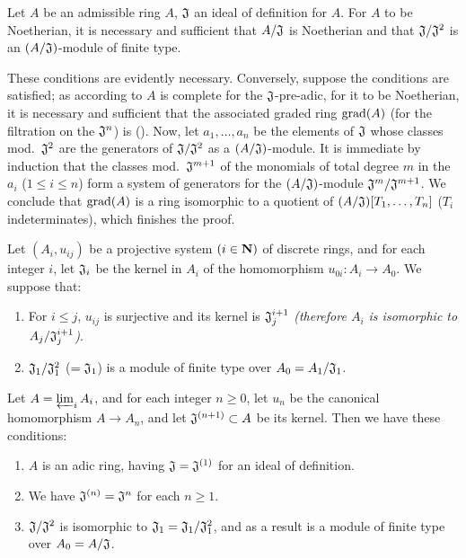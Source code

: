 \begin{cor}[7.2.6]
\label{0.7.2.6}
Let $A$ be an admissible ring $A$, $\mathfrak{J}$ an ideal of definition for
$A$. For $A$ to be Noetherian, it is necessary and sufficient that
$A/\mathfrak{J}$ is Noetherian and that $\mathfrak{J}/\mathfrak{J}^2$ is an
$(A/\mathfrak{J})$-module of finite type.
\end{cor}

These conditions are evidently necessary. Conversely, suppose the conditions
are satisfied; as according to  $A$ is complete for the
$\mathfrak{J}$-pre-adic, for it to be Noetherian, it is necessary and sufficient
that the associated graded ring ${\mathop{\mathrm{grad}}\nolimits}(A)$ (for the filtration on the
$\mathfrak{J}^n$) is (\cite[p~.18--07, th.~4]{I-1}). Now, let $a_1,\dots,a_n$ be
the elements of $\mathfrak{J}$ whose classes mod.~$\mathfrak{J}^2$ are the
generators of $\mathfrak{J}/\mathfrak{J}^2$ as a $(A/\mathfrak{J})$-module. It
is immediate by induction that the classes mod.~$\mathfrak{J}^{m+1}$ of the
monomials of total degree $m$ in the $a_i$ ($1\leqslant i\leqslant n$) form a
system of generators for the $(A/\mathfrak{J})$-module
$\mathfrak{J}^m/\mathfrak{J}^{m+1}$. We conclude that ${\mathop{\mathrm{grad}}\nolimits}(A)$ is a ring
isomorphic to a quotient of $(A/\mathfrak{J})[T_1,\dots,T_n]$ ($T_i$
indeterminates), which finishes the proof.

\begin{prop}[7.2.7]
\label{0.7.2.7}
Let $(A_i,u_{ij})$ be a projective system $(i\in\mathbf{N})$ of discrete rings, and
for each integer $i$, let $\mathfrak{J}_i$ be the kernel in $A_i$ of the
homomorphism $u_{0i}:A_i\to A_0$. We suppose that:
\begin{enumerate}[label=\emph{(\alph*)}]
  \item For $i\leqslant j$, $u_{ij}$ is surjective and its kernel is $\mathfrak{J}_j^{i+1}$
    \emph{(therefore $A_i$ is isomorphic to $A_j/\mathfrak{J}_j^{i+1}$)}.
  \item $\mathfrak{J}_1/\mathfrak{J}_1^2$ ($=\mathfrak{J}_1$) is a module of
    finite type over $A_0=A_1/\mathfrak{J}_1$.
\end{enumerate}
Let $A=\varprojlim_i A_i$, and for each integer $n\geqslant 0$, let $u_n$ be the
canonical homomorphism $A\to A_n$, and let $\mathfrak{J}^{(n+1)}\subset A$ be
its kernel. Then we have these conditions:
\begin{enumerate}[label=\emph{(\roman*)}]
  \item $A$ is an adic ring, having $\mathfrak{J}=\mathfrak{J}^{(1)}$ for an
    ideal of definition.
  \item We have $\mathfrak{J}^{(n)}=\mathfrak{J}^n$ for each $n\geqslant 1$.
  \item $\mathfrak{J}/\mathfrak{J}^2$ is isomorphic to
    $\mathfrak{J}_1=\mathfrak{J}_1/\mathfrak{J}_1^2$, and as a result is a module of finite type
    over $A_0=A/\mathfrak{J}$.
\end{enumerate}
\end{prop}


